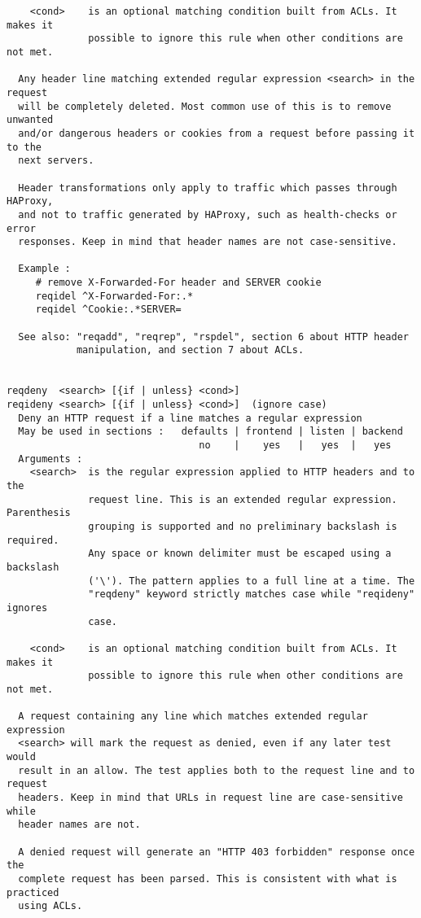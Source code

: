 \begin{verbatim}
    <cond>    is an optional matching condition built from ACLs. It makes it
              possible to ignore this rule when other conditions are not met.

  Any header line matching extended regular expression <search> in the request
  will be completely deleted. Most common use of this is to remove unwanted
  and/or dangerous headers or cookies from a request before passing it to the
  next servers.

  Header transformations only apply to traffic which passes through HAProxy,
  and not to traffic generated by HAProxy, such as health-checks or error
  responses. Keep in mind that header names are not case-sensitive.

  Example :
     # remove X-Forwarded-For header and SERVER cookie
     reqidel ^X-Forwarded-For:.*
     reqidel ^Cookie:.*SERVER=

  See also: "reqadd", "reqrep", "rspdel", section 6 about HTTP header
            manipulation, and section 7 about ACLs.


reqdeny  <search> [{if | unless} <cond>]
reqideny <search> [{if | unless} <cond>]  (ignore case)
  Deny an HTTP request if a line matches a regular expression
  May be used in sections :   defaults | frontend | listen | backend
                                 no    |    yes   |   yes  |   yes
  Arguments :
    <search>  is the regular expression applied to HTTP headers and to the
              request line. This is an extended regular expression. Parenthesis
              grouping is supported and no preliminary backslash is required.
              Any space or known delimiter must be escaped using a backslash
              ('\'). The pattern applies to a full line at a time. The
              "reqdeny" keyword strictly matches case while "reqideny" ignores
              case.

    <cond>    is an optional matching condition built from ACLs. It makes it
              possible to ignore this rule when other conditions are not met.

  A request containing any line which matches extended regular expression
  <search> will mark the request as denied, even if any later test would
  result in an allow. The test applies both to the request line and to request
  headers. Keep in mind that URLs in request line are case-sensitive while
  header names are not.

  A denied request will generate an "HTTP 403 forbidden" response once the
  complete request has been parsed. This is consistent with what is practiced
  using ACLs.


\end{verbatim}
